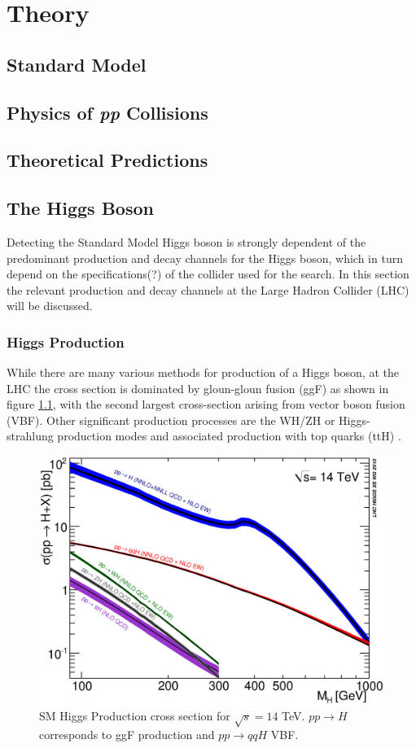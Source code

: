 \chapter{Theory}\label{c:Theory}

\section{Standard Model}

\section{Physics of \textit{pp} Collisions}

\section{Theoretical Predictions}

\section{The Higgs Boson}

	Detecting the Standard Model Higgs boson is strongly dependent of the predominant production and decay channels for the Higgs boson, which in turn depend on the specifications(?) of the collider used for the search. In this section the relevant production and decay channels at the Large Hadron Collider (LHC) will be discussed.

	\subsection{Higgs Production}
	
		While there are many various methods for production of a Higgs boson, at the LHC the cross section is dominated by gloun-gloun fusion (ggF) as shown in figure \ref{fig:higgsproductionCS}, with the second largest cross-section arising from vector boson fusion (VBF). Other significant production processes are the WH/ZH or Higgs-strahlung production modes and associated production with top quarks (ttH) \cite{LHCHiggsCS}. 
		
			\begin{figure}[h]
				\centering
				\includegraphics[width=0.7\linewidth]{T/FIGS/YRHXS_Summary_fig3}
				\caption{SM Higgs Production cross section for $\sqrt{s}=14$ TeV. $pp\rightarrow H$ corresponds to ggF production and $pp\rightarrow qqH$ VBF. \cite{LHCHiggsCS}}
				\label{fig:higgsproductionCS}
			\end{figure}
		

